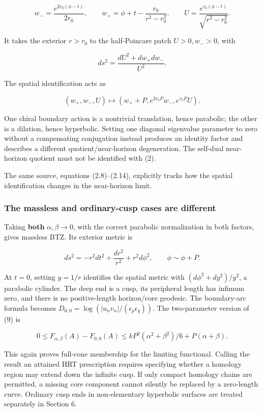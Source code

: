 \documentclass[11pt]{article}
\begin{document}
\[
w_- =\frac{e^{2r_0(\phi-t)}}{2r_0},\qquad
w_+=\phi+t-\frac{r_0}{r^2-r_0^2},\qquad
U=\frac{e^{r_0(\phi-t)}}{\sqrt{r^2-r_0^2}}.
\tag{1}
\]

It takes the exterior \(r>r_0\) to the half-Poincare patch
\(U>0,w_->0\), with

\[
ds^2=\frac{dU^2+dw_+dw_-}{U^2}.
\]

The spatial identification acts as

\[
(w_+,w_-,U)\longmapsto
(w_++P,e^{2r_0P}w_-,e^{r_0P}U).
\tag{2}
\]

One chiral boundary action is a nontrivial translation, hence parabolic;
the other is a dilation, hence hyperbolic. Setting one diagonal
eigenvalue parameter to zero without a compensating conjugation instead
produces an identity factor and describes a different
quotient/near-horizon degeneration. The self-dual near-horizon quotient
must not be identified with (2).

The same source, equations (2.8)--(2.14), explicitly tracks how the
spatial identification changes in the near-horizon limit.

\subsubsection{The massless and ordinary-cusp cases are
different}\label{the-massless-and-ordinary-cusp-cases-are-different}

Taking \textbf{both} \(\alpha,\beta\to0\), with the correct parabolic
normalization in both factors, gives massless BTZ. Its exterior metric
is

\[
ds^2=-r^2dt^2+\frac{dr^2}{r^2}+r^2d\phi^2,
\qquad \phi\sim\phi+P.
\]

At \(t=0\), setting \(y=1/r\) identifies the spatial metric with
\((d\phi^2+dy^2)/y^2\), a parabolic cylinder. The deep end is a cusp,
its peripheral length has infimum zero, and there is no positive-length
horizon/core geodesic. The boundary-arc formula becomes
\(D_{0,0}=\log(|u_nv_n|/(\epsilon_p\epsilon_q))\). The two-parameter
version of (9) is

\[
0\le F_{\alpha,\beta}(A)-F_{0,0}(A)
\le kP^2(\alpha^2+\beta^2)/6+P(\alpha+\beta).
\]

This again proves full-cone membership for the limiting functional.
Calling the result an attained HRT prescription requires specifying
whether a homology region may extend down the infinite cusp. If only
compact homology chains are permitted, a missing core component cannot
silently be replaced by a zero-length curve. Ordinary cusp ends in
non-elementary hyperbolic surfaces are treated separately in Section 6.
\end{document}
